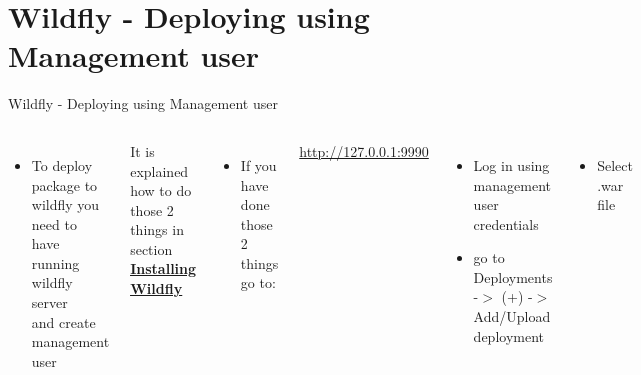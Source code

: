 \documentclass[aspectratio=1610,english]{beamer} %
\begin{document}
	\section{Wildfly - Deploying using Management user}
	\begin{frame}{Wildfly - Deploying using Management user}
		\begin{columns}
				\begin{itemize}
					\tiny
					\color{black}
					\item To deploy package to wildfly you need to \\ 
						have running wildfly server \\ 
						and create management user \\
				\end{itemize}
				\tiny
				It is explained how to do those 2 things in section
				\hyperlink{page.8}{\textbf{\underline{Installing Wildfly}}} \\
				
				\begin{itemize}
					\tiny
					\color{black}
					\item If you have done those 2 things go to:
				\end{itemize}
				\tiny
				\url{http://127.0.0.1:9990}
				
				\begin{itemize}
					\tiny
					\color{black}
					\item Log in using management user credentials
					\item go to Deployments -$>$ (+) -$>$ Add/Upload deployment \\
				\end{itemize}
				
				\begin{itemize}
					\tiny
					\color{black}
					\item Select .war file 
				\end{itemize}
				\fontsize{3}{4} \selectfont 
				

\end{columns}
\end{frame}
\end{document}
